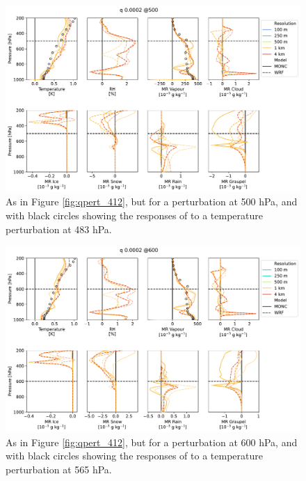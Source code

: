\documentclass[draft]{agujournal2019}
\begin{document}
\begin{figure}[pth]
    \noindent\includegraphics[width=\textwidth]{figures/pert_diffs_q_0.0002_@500}
    \caption{As in Figure \ref{fig:qpert_412}, but for a perturbation at 500
    hPa, and with black circles showing the responses of 
    to a temperature perturbation at 483 hPa.}
    \label{fig:qpert_500}
\end{figure}

\begin{figure}[pth]
    \noindent\includegraphics[width=\textwidth]{figures/pert_diffs_q_0.0002_@600}
    \caption{As in Figure \ref{fig:qpert_412}, but for a perturbation at 600
    hPa, and with black circles showing the responses of 
    to a temperature perturbation at 565 hPa.}
    \label{fig:qpert_600}
\end{figure}
\end{document}
